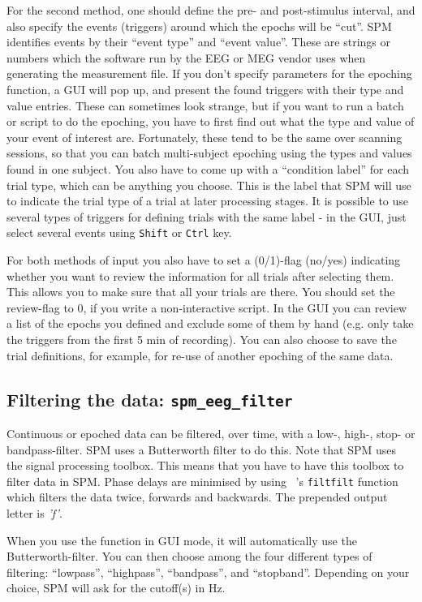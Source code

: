 For the second method, one should define the pre- and post-stimulus interval, and also specify the events (triggers) around which the epochs will be ``cut''. SPM identifies events by their ``event type'' and ``event value''. These are strings or numbers which the software run by the EEG or MEG vendor uses when generating the measurement file. If you don't specify parameters for the epoching function, a GUI will pop up, and present the found triggers with their type and value entries. These can sometimes look strange, but if you want to run a batch or script to do the epoching, you have to first find out what the type and value of your event of interest are. Fortunately, these tend to be the same over scanning sessions, so that you can batch multi-subject epoching using the types and values found in one subject. You also have to come up with a ``condition label'' for each trial type, which can be anything you choose. This is the label that SPM will use to indicate the trial type of a trial at later processing stages. It is possible to use several types of triggers for defining trials with the same label - in the GUI, just select several events using \texttt{Shift} or \texttt{Ctrl} key.

For both methods of input you also have to set a (0/1)-flag (no/yes) indicating whether you want to review the information for all trials after selecting them. This allows you to make sure that all your trials are there. You should set the review-flag to 0, if you write a non-interactive script. In the GUI you can review a list of the epochs you defined and exclude some of them by hand (e.g. only take the triggers from the first 5 min of recording). You can also choose to save the trial definitions, for example, for re-use of another epoching of the same data.

\subsection{Filtering the data: \texttt{spm\_eeg\_filter}} 
Continuous or epoched data can be filtered, over time, with a low-, high-, stop- or bandpass-filter. SPM uses a Butterworth filter to do this. Note that SPM uses the signal processing toolbox. This means that you have to have this toolbox to filter data in SPM. Phase delays are minimised by using \matlab\ 's \texttt{filtfilt} function which filters the data twice, forwards and backwards. The prepended output letter is \textit{'f'}.

When you use the function in GUI mode, it will automatically
use the Butterworth-filter. You can then choose among the four different types of filtering: ``lowpass'', ``highpass'', ``bandpass'',
and ``stopband''. Depending on your choice, SPM will ask for the cutoff(s) in Hz.

